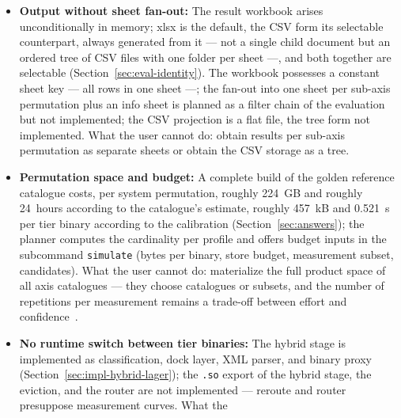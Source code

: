 \begin{nurlang}
\begin{itemize}
  three functions: the acquisition (the ISA complex axis with the SPD/XMP declaration of the memory
  clocking and the planner probe, which asks the host for its counters per run), the compile-time
  factory (the tier stamps from the actual properties), and the runtime verdict; the machine
  declarations of the system registry are declarations with a preserved source
  (\texttt{dmidecode}). Not present are the wiring into runner and probe dock, the additive result
  write-back, the provenance round trip of the declarations, and the fit stamp. What the user
  cannot do: have the fit between machine and binary checked automatically
  (Sections~\ref{sec:hw-probe} and~\ref{sec:impl-system-axes}).
  \item \textbf{Output without sheet fan-out:} The result workbook arises unconditionally in
  memory; xlsx is the default, the CSV form its selectable counterpart, always generated from it
  --- not a single child document but an ordered tree of CSV files with one folder per sheet ---,
  and both together are selectable
  (Section~\ref{sec:eval-identity}). The workbook possesses a constant sheet key --- all rows in
  one sheet ---; the fan-out into one sheet per sub-axis permutation plus an info sheet is planned
  as a filter chain of the evaluation but not implemented; the CSV projection is a flat file, the
  tree form not implemented. What the user cannot do: obtain results per sub-axis permutation as
  separate sheets or obtain the CSV storage as a tree.
  \item \textbf{Permutation space and budget:} A complete build of the golden reference catalogue
  costs, per system permutation, roughly 224~GB and roughly 24~hours according to the catalogue's
  estimate, roughly 457~kB and 0.521~s per tier binary according to the calibration
  (Section~\ref{sec:answers}); the planner computes the cardinality per profile and offers budget
  inputs in the subcommand \texttt{simulate} (bytes per binary, store budget, measurement subset,
  candidates). What the user cannot do: materialize the full product space of all axis catalogues
  --- they choose catalogues or subsets, and the number of repetitions per measurement remains a
  trade-off between effort and confidence~\cite{kalibera2013rigorous}.
  \item \textbf{No runtime switch between tier binaries:} The hybrid stage is implemented as
  classification, dock layer, XML parser, and binary proxy
  (Section~\ref{sec:impl-hybrid-lager}); the \texttt{.so} export of the hybrid stage, the eviction,
  and the router are not implemented --- reroute and router presuppose measurement curves. What the

\end{itemize}
\end{nurlang}
